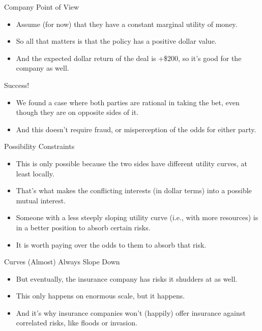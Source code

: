 \documentclass[
  ignorenonframetext,
]{beamer}
\providecommand{\tightlist}{%
  \setlength{\itemsep}{0pt}\setlength{\parskip}{0pt}}
\begin{document}
\begin{frame}{Company Point of View}
\protect\hypertarget{company-point-of-view}{}
\begin{itemize}
\tightlist
\item
  Assume (for now) that they have a constant marginal utility of money.
\item
  So all that matters is that the policy has a positive dollar value.
\item
  And the expected dollar return of the deal is +\$200, so it's good for
  the company as well.
\end{itemize}
\end{frame}

\begin{frame}{Success!}
\protect\hypertarget{success}{}
\begin{itemize}
\tightlist
\item
  We found a case where both parties are rational in taking the bet,
  even though they are on opposite sides of it.
\item
  And this doesn't require fraud, or misperception of the odds for
  either party.
\end{itemize}
\end{frame}

\begin{frame}{Possibility Constraints}
\protect\hypertarget{possibility-constraints}{}
\begin{itemize}
\tightlist
\item
  This is only possible because the two sides have different utility
  curves, at least locally.
\item
  That's what makes the conflicting interests (in dollar terms) into a
  possible mutual interest.
\item
  Someone with a less steeply sloping utility curve (i.e., with more
  resources) is in a better position to absorb certain risks.
\item
  It is worth paying over the odds to them to absorb that risk.
\end{itemize}
\end{frame}

\begin{frame}{Curves (Almost) Always Slope Down}
\protect\hypertarget{curves-almost-always-slope-down}{}
\begin{itemize}
\tightlist
\item
  But eventually, the insurance company has risks it shudders at as
  well.
\item
  This only happens on enormous scale, but it happens.
\item
  And it's why insurance companies won't (happily) offer insurance
  against correlated risks, like floods or invasion.
\end{itemize}
\end{frame}
\end{document}
